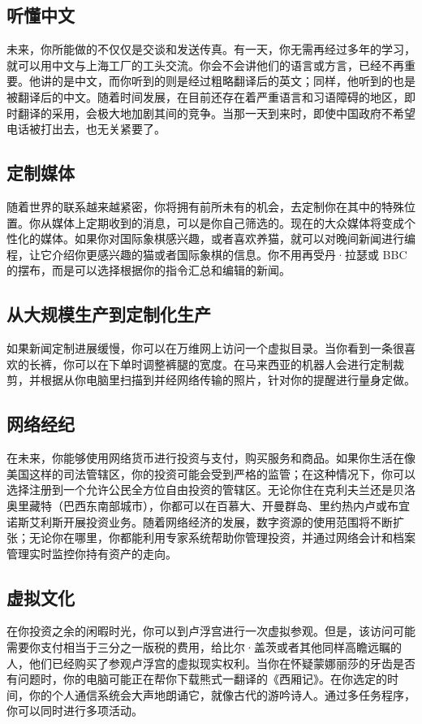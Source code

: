 \subsection{听懂中文}
未来，你所能做的不仅仅是交谈和发送传真。有一天，你无需再经过多年的学习，就可以用中文与上海工厂的工头交流。你会不会讲他们的语言或方言，已经不再重要。他讲的是中文，而你听到的则是经过粗略翻译后的英文；同样，他听到的也是被翻译后的中文。随着时间发展，在目前还存在着严重语言和习语障碍的地区，即时翻译的采用，会极大地加剧其间的竞争。当那一天到来时，即使中国政府不希望电话被打出去，也无关紧要了。

\subsection{定制媒体}
随着世界的联系越来越紧密，你将拥有前所未有的机会，去定制你在其中的特殊位置。你从媒体上定期收到的消息，可以是你自己筛选的。现在的大众媒体将变成个性化的媒体。如果你对国际象棋感兴趣，或者喜欢养猫，就可以对晚间新闻进行编程，让它介绍你更感兴趣的猫或者国际象棋的信息。你不用再受丹·拉瑟或 BBC 的摆布，而是可以选择根据你的指令汇总和编辑的新闻。

\subsection{从大规模生产到定制化生产}
如果新闻定制进展缓慢，你可以在万维网上访问一个虚拟目录。当你看到一条很喜欢的长裤，你可以在下单时调整裤腿的宽度。在马来西亚的机器人会进行定制裁剪，并根据从你电脑里扫描到并经网络传输的照片，针对你的提醒进行量身定做。

\subsection{网络经纪}
在未来，你能够使用网络货币进行投资与支付，购买服务和商品。如果你生活在像美国这样的司法管辖区，你的投资可能会受到严格的监管；在这种情况下，你可以选择注册到一个允许公民全方位自由投资的管辖区。无论你住在克利夫兰还是贝洛奥里藏特（巴西东南部城市），你都可以在百慕大、开曼群岛、里约热内卢或布宜诺斯艾利斯开展投资业务。随着网络经济的发展，数字资源的使用范围将不断扩张；无论你在哪里，你都能利用专家系统帮助你管理投资，并通过网络会计和档案管理实时监控你持有资产的走向。

\subsection{虚拟文化}
在你投资之余的闲暇时光，你可以到卢浮宫进行一次虚拟参观。但是，该访问可能需要你支付相当于三分之一版税的费用，给比尔·盖茨或者其他同样高瞻远瞩的人，他们已经购买了参观卢浮宫的虚拟现实权利。当你在怀疑蒙娜丽莎的牙齿是否有问题时，你的电脑可能正在帮你下载熊式一翻译的《西厢记》。在你选定的时间，你的个人通信系统会大声地朗诵它，就像古代的游吟诗人。通过多任务程序，你可以同时进行多项活动。

